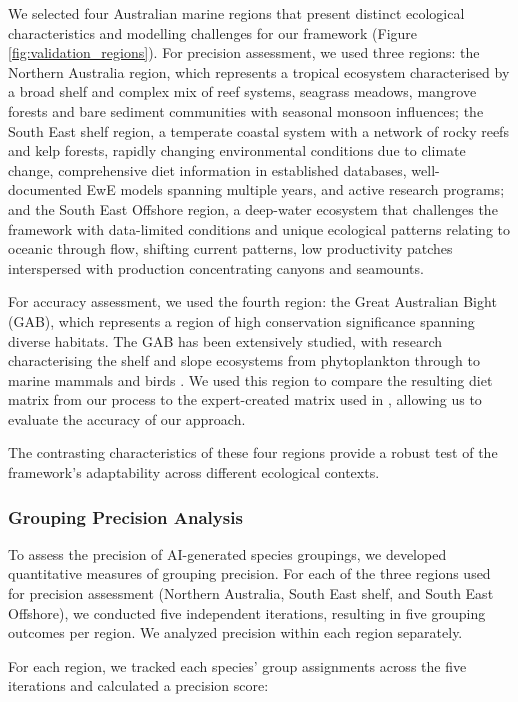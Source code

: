 We selected four Australian marine regions that present distinct ecological characteristics and modelling challenges for our framework (Figure \ref{fig:validation_regions}). For precision assessment, we used three regions: the Northern Australia region, which represents a tropical ecosystem characterised by a broad shelf and complex mix of reef systems, seagrass meadows, mangrove forests and bare sediment communities with seasonal monsoon influences; the South East shelf region, a temperate coastal system with a network of rocky reefs and kelp forests, rapidly changing environmental conditions due to climate change, comprehensive diet information in established databases, well-documented EwE models spanning multiple years, and active research programs; and the South East Offshore region, a deep-water ecosystem that challenges the framework with data-limited conditions and unique ecological patterns relating to oceanic through flow, shifting current patterns, low productivity patches interspersed with production concentrating canyons and seamounts.

For accuracy assessment, we used the fourth region: the Great Australian Bight (GAB), which represents a region of high conservation significance spanning diverse habitats. The GAB has been extensively studied, with research characterising the shelf and slope ecosystems from phytoplankton through to marine mammals and birds \citep{goldsworthy2013trophodynamics, Fulton2018}. We used this region to compare the resulting diet matrix from our process to the expert-created matrix used in \citep{Fulton2018}, allowing us to evaluate the accuracy of our approach.

The contrasting characteristics of these four regions provide a robust test of the framework's adaptability across different ecological contexts.

\subsubsection{Grouping Precision Analysis}

To assess the precision of AI-generated species groupings, we developed quantitative measures of grouping precision. For each of the three regions used for precision assessment (Northern Australia, South East shelf, and South East Offshore), we conducted five independent iterations, resulting in five grouping outcomes per region. We analyzed precision within each region separately.

For each region, we tracked each species' group assignments across the five iterations and calculated a precision score:

